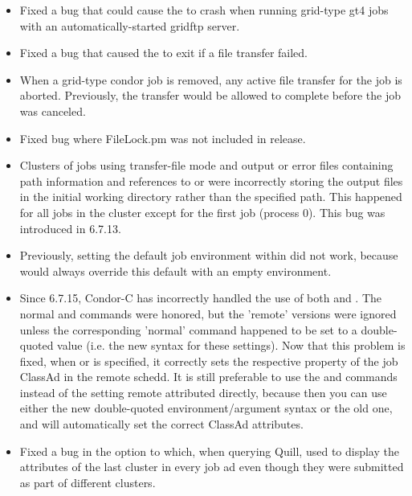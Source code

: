\begin{itemize}
\item Fixed a bug that could cause the  to crash
when running grid-type gt4 jobs with an automatically-started gridftp
server.

\item Fixed a bug that caused the  to exit if a file
transfer failed.

\item When a grid-type condor job is removed, any active file transfer
for the job is aborted. Previously, the transfer would be allowed to
complete before the job was canceled.

\item Fixed bug where FileLock.pm was not included in release.

\item Clusters of jobs using transfer-file mode and output or error
files containing path information and references to  or
 were incorrectly storing the output files in the initial
working directory rather than the specified path.  This happened for
all jobs in the cluster except for the first job (process 0).  This
bug was introduced in 6.7.13.

\item Previously, setting the default job environment within
 did not work, because  would
always override this default with an empty environment.

\item Since 6.7.15, Condor-C has incorrectly handled the use of both
 and .  The normal
 and  commands were
honored, but the 'remote' versions were ignored unless the
corresponding 'normal' command happened to be set to a double-quoted
value (i.e. the new syntax for these settings).  Now that this problem
is fixed, when  or  is
specified, it correctly sets the respective property of the job
ClassAd in the remote schedd.  It is still preferable to use the
 and  commands instead of
the setting remote attributed directly, because then you can use either
the new double-quoted environment/argument syntax or the old one, and
 will automatically set the correct ClassAd attributes.

\item Fixed a bug in the  option to  which, when 
querying Quill, used to display the attributes of the last cluster in 
every job ad even though they were submitted as part of different 
clusters.


\end{itemize}
